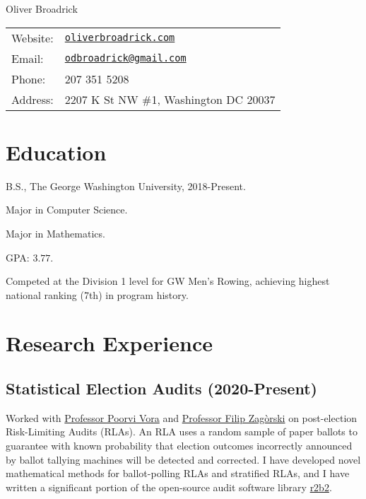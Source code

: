 \documentclass[letterpaper]{article}
\def\name{Oliver Broadrick}
\renewenvironment{itemize}{
  \begin{list}{}{
    \setlength{\leftmargin}{1.5em}
  }
}{
  \end{list}
}
\begin{document}
{\huge \name}

\vspace{0.25in}

\begin{minipage}{0.45\linewidth}
  \begin{tabular}{ll}
    Website: & \href{https://oliverbroadrick.com/}{\tt oliverbroadrick.com} \\
    Email: & \href{mailto:odbroadrick@gmail.com}{\tt odbroadrick@gmail.com} \\
    Phone: & 207 351 5208 \\
    Address: & 2207 K St NW \#1, Washington DC 20037
  \end{tabular}
\end{minipage}


\section*{Education}

\begin{itemize}

\item B.S., The George Washington University, 2018-Present.
\begin{itemize}
  \item Major in Computer Science.
  \item Major in Mathematics.
  \item GPA: $3.77$.
  \item Competed at the Division 1 level for GW Men's Rowing, achieving highest national ranking (7th) in program history.
\end{itemize}

\end{itemize}


\section*{Research Experience}

\subsection*{Statistical Election Audits (2020-Present)}
Worked with \href{https://www2.seas.gwu.edu/~poorvi/}{Professor Poorvi Vora} and 
\href{https://zagorski.im.pwr.wroc.pl/}{Professor Filip Zag\`{o}rski} on post-election
Risk-Limiting Audits (RLAs). An RLA uses a random sample of paper ballots to
guarantee with known probability 
that election outcomes incorrectly announced by ballot tallying machines will be 
detected and corrected.
I have developed novel mathematical methods for ballot-polling RLAs and stratified RLAs, 
and I have written a significant portion of the open-source audit software library 
\href{https://github.com/gwexploratoryaudits/r2b2}{r2b2}.
\end{document}
